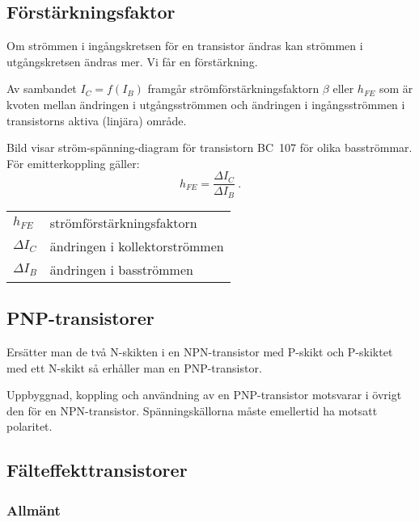 \subsection{Förstärkningsfaktor}
\label{transistor_förstärkningsfaktor}

Om strömmen i ingångskretsen för en transistor ändras kan strömmen i
utgångskretsen ändras mer.
Vi får en förstärkning.

Av sambandet \(I_C = f(I_B)\) framgår strömförstärkningsfaktorn \(\beta\) eller
\(h_{FE}\) som är kvoten mellan ändringen i utgångsströmmen och ändringen i ingångsströmmen i
transistorns aktiva (linjära) område.

Bild  visar ström-spänning-diagram för transistorn BC~107 
för olika basströmmar.
För emitterkoppling gäller:
\[h_{FE} = \dfrac{\Delta I_C}{\Delta I_B}~.\]
\begin{tabular}{ll}
  \(h_{FE}\) & strömförstärkningsfaktorn \\
  \(\Delta I_C\)   & ändringen i kollektorströmmen \\
  \(\Delta I_B\)   & ändringen i basströmmen \\
\end{tabular}

\subsection{PNP-transistorer}
\label{transistor_pnp}

Ersätter man de två N-skikten i en NPN-transistor med P-skikt och P-skiktet med
ett N-skikt så erhåller man en PNP-transistor.

Uppbyggnad, koppling och användning av en PNP-transistor motsvarar i övrigt den
för en NPN-transistor. Spänningskällorna måste emellertid ha motsatt polaritet.

\newpage %
\subsection{Fälteffekttransistorer}

\subsubsection{Allmänt}


